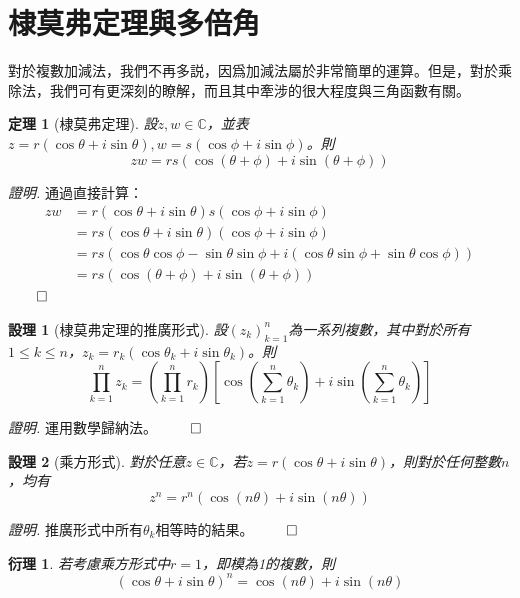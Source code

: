 \documentclass[12pt]{article}
\newtheorem*{theorem}{定理}
\newtheorem*{corollary}{衍理}
\newtheorem*{proposition}{設理}
\renewenvironment*{proof}{\textit{證明.}}{\hfill$\qed$}
\begin{document}
    \section*{棣莫弗定理與多倍角}

    對於複數加減法，我們不再多説，因爲加減法屬於非常簡單的運算。但是，對於乘除法，我們可有更深刻的瞭解，而且其中牽涉的很大程度與三角函數有關。

    \begin{theorem}[棣莫弗定理]
        設$z,w\in\mathbb{C}$，並表$z=r(\cos{\theta}+i\sin{\theta}),w=s(\cos{\phi}+i\sin{\phi})$。則$$zw=rs(\cos(\theta+\phi)+i\sin(\theta+\phi))$$
    \end{theorem}

    \begin{proof}
        通過直接計算：\begin{align*}
            zw&=r(\cos{\theta}+i\sin{\theta})s(\cos{\phi}+i\sin{\phi})\\
            &=rs(\cos{\theta}+i\sin{\theta})(\cos{\phi}+i\sin{\phi})\\
            &=rs(\cos{\theta}\cos{\phi}-\sin{\theta}\sin{\phi}+i(\cos{\theta}\sin{\phi}+\sin{\theta}\cos{\phi}))\\
            &=rs(\cos(\theta+\phi)+i\sin(\theta+\phi))
        \end{align*}
    \end{proof}

    \begin{proposition}[棣莫弗定理的推廣形式]
        設$(z_k)_{k=1}^n$為一系列複數，其中對於所有$1\leq k\leq n$，$z_k=r_k(\cos{\theta_k}+i\sin{\theta_k})$。則$$\prod_{k=1}^{n}z_k=(\prod_{k=1}^{n}r_k)[\cos(\sum_{k=1}^{n}\theta_k)+i\sin(\sum_{k=1}^{n}\theta_k)]$$
    \end{proposition}

    \begin{proof}
        運用數學歸納法。
    \end{proof}

    \begin{proposition}[乘方形式]
        對於任意$z\in\mathbb{C}$，若$z=r(\cos{\theta}+i\sin{\theta})$，則對於任何整數$n$，均有$$z^n=r^n(\cos(n\theta)+i\sin(n\theta))$$
    \end{proposition}

    \begin{proof}
        推廣形式中所有$\theta_k$相等時的結果。
    \end{proof}

    \begin{corollary}
        若考慮乘方形式中$r=1$，即模為1的複數，則$$(\cos{\theta}+i\sin{\theta})^n=\cos(n\theta)+i\sin(n\theta)$$
    \end{corollary}
\end{document}
